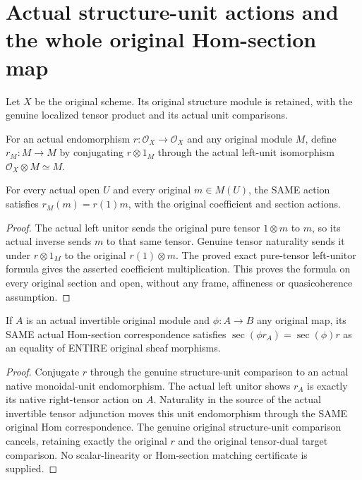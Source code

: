 \section{Actual structure-unit actions and the whole original Hom-section map}
\label{sec:scheme-unit-scalar-action}

Let $X$ be the original scheme. Its original structure module is retained,
with the genuine localized tensor product and its actual unit comparisons.

\begin{definition}
\label{sc0-unit-scalar-action:actual-action}
\leanok
For an actual endomorphism $r:\mathcal O_X\to\mathcal O_X$ and any original
module $M$, define $r_M:M\to M$ by conjugating $r\otimes1_M$ through the
actual left-unit isomorphism $\mathcal O_X\otimes M\simeq M$.
\end{definition}

\begin{theorem}
\label{sc0-unit-scalar-action:whole-sections}
\leanok
For every actual open $U$ and every original $m\in M(U)$, the SAME action
satisfies $r_M(m)=r(1)m$, with the original coefficient and section actions.
\end{theorem}
\begin{proof}
The actual left unitor sends the original pure tensor $1\otimes m$ to $m$,
so its actual inverse sends $m$ to that same tensor. Genuine tensor naturality
sends it under $r\otimes1_M$ to the original $r(1)\otimes m$. The proved exact pure-tensor left-unitor formula gives the asserted coefficient
multiplication. This proves the formula on every original section and open,
without any frame, affineness or quasicoherence assumption.
\end{proof}

\begin{theorem}
\label{sc0-unit-scalar-action:whole-hom-section}
\leanok
If $A$ is an actual invertible original module and $\phi:A\to B$ any original
map, its SAME actual Hom-section correspondence satisfies
$\operatorname{sec}(\phi r_A)=\operatorname{sec}(\phi)r$ as an equality of
ENTIRE original sheaf morphisms.
\end{theorem}
\begin{proof}
Conjugate $r$ through the genuine structure-unit comparison to an actual native
monoidal-unit endomorphism. The actual left unitor shows $r_A$ is exactly its
native right-tensor action on $A$. Naturality in the source of the actual
invertible tensor adjunction moves this unit endomorphism through the SAME
original Hom correspondence. The genuine original structure-unit comparison
cancels, retaining exactly the original $r$ and the original tensor-dual target
comparison. No scalar-linearity or Hom-section matching certificate is supplied.
\end{proof}

